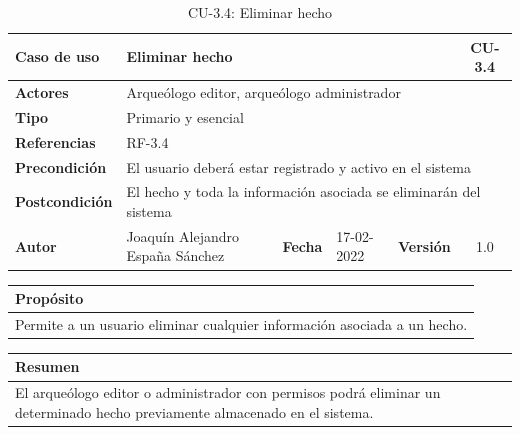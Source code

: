     \begin{table}[H]
    \begin{center}
        \begin{adjustbox}{width=\textwidth}
        \begin{tabular}{ | l | l | l | l | c | c | } 
            \hline
            \textbf{Caso de uso} & \multicolumn{4}{l|}{Eliminar hecho} & \cellcolor{gray!50} \textbf{CU-3.4}\\
            \hline
            \textbf{Actores} & \multicolumn{5}{p{0.9\linewidth}|}{Arqueólogo editor, arqueólogo administrador} \\
            \hline
            \textbf{Tipo} & \multicolumn{5}{l|}{Primario y esencial} \\
            \hline
            \textbf{Referencias} & \multicolumn{3}{l|}{RF-3.4} & \multicolumn{2}{l|}{ }\\
            \hline
            \textbf{Precondición} & \multicolumn{5}{l|}{El usuario deberá estar registrado y activo en el sistema} \\
            \hline
            \textbf{Postcondición} & \multicolumn{5}{l|}{El hecho y toda la información asociada se eliminarán del sistema} \\
            \hline
            \textbf{Autor} & \multicolumn{1}{p{0.25\linewidth}|}{Joaquín Alejandro España Sánchez} & \textbf{Fecha} & 
            17-02-2022     & \textbf{Versión}                                                      & 1.0\\
            \hline
        \end{tabular}
        \end{adjustbox}
        \caption{CU-3.4: Eliminar hecho}
        \label{tab:delete-fact}
    \end{center}
    \end{table}

    \begin{table}[H]
        \centering
        \begin{tabularx}{\textwidth}{@{} |L |@{}} \hline
            \textbf{Propósito} \\
            \hline
            Permite a un usuario eliminar cualquier información asociada a un hecho. \\
            \hline
        \end{tabularx}
    \end{table}

    \begin{table}[H]
        \centering
        \begin{tabularx}{\textwidth}{@{} |L |@{}} \hline
            \textbf{Resumen} \\
            \hline
            El arqueólogo editor o administrador con permisos podrá eliminar un determinado
            hecho previamente almacenado en el sistema. \\
            \hline
        \end{tabularx}
    \end{table}

